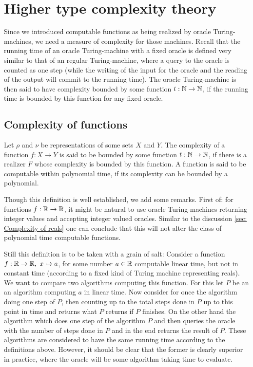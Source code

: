 \section{Higher type complexity theory}

Since we introduced computable functions as being realized by oracle Turing-machines, we need a measure of complexity for those machines. Recall that the running time of an oracle Turing-machine with a fixed oracle is defined very similar to that of an regular Turing-machine, where a query to the oracle is counted as one step (while the writing of the input for the oracle and the reading of the output will commit to the running time). The oracle Turing-machine is then said to have complexity bounded by some function $t:\operatorname{\mathbb{N}} \to \operatorname{\mathbb{N}}$, if the running time is bounded by this function for any fixed oracle.

\subsection{Complexity of functions}

Let $\rho$ and $\nu$ be representations of some sets $X$ and $Y$. The complexity  of a function $f:X\to Y$ is said to be bounded by some function $t:\operatorname{\mathbb{N}}\to \operatorname{\mathbb{N}}$, if there is a realizer $F$ whose complexity is bounded by this function. A function is said to be computable within polynomial time, if its complexity can be bounded by a polynomial.

Though this definition is well established, we add some remarks. First of: for functions $f:\operatorname{\mathbb{R}}\to \operatorname{\mathbb{R}}$, it might be natural to use oracle Turing-machines returning integer values and accepting integer valued oracles. Similar to the discussion \cref{sec: Complexity of reals} one can conclude that this will not alter the class of polynomial time computable functions.

Still this definition is to be taken with a grain of salt:  Consider a function $f:\operatorname{\mathbb{R}}\to\operatorname{\mathbb{R}}, ~ x\mapsto a$, for some number $a\in \operatorname{\mathbb{R}}$ computable linear time, but not in constant time (according to a fixed kind of Turing machine representing reals). We want to compare two algorithms computing this function. For this let $P$ be an an algorithm computing $a$ in linear time. Now consider for once the algorithm doing one step of $P$, then counting up to the total steps done in $P$ up to this point in time and returns what $P$ returns if $P$ finishes. On the other hand the algorithm which does one step of the algorithm $P$ and then queries the oracle with the number of steps done in $P$ and in the end returns the result of $P$. These algorithms are considered to have the same running time according to the definitions above. However, it should be clear that the former is clearly superior in practice, where the oracle will be some algorithm taking time to evaluate.

